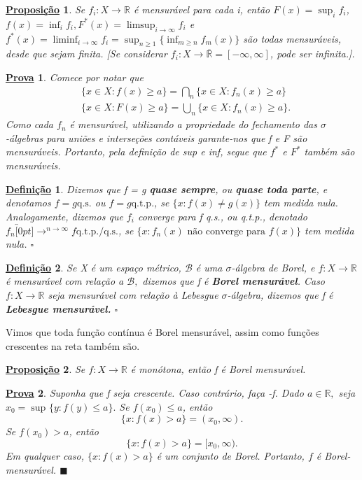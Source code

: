 \documentclass{article}
\newtheorem*{def*}{\underline{Defini\c c\~ao}}
\newtheorem*{prop*}{\underline{Proposi\c c\~ao}}
\newtheorem*{proof*}{\underline{Prova}}
\renewcommand\qedsymbol{$\blacksquare$}
\begin{document}
\begin{prop*}
  Se \(f_{i}:X\rightarrow \mathbb{R} \) é mensurável para cada i, então \(F(x) = \sup_{i}f_{i}\), \(f(x) = \inf_{i}f_{i}, F^{*}(x) = \limsup_{i\to \infty}f_{i}\)
  e \(f^{*}(x) = \liminf_{i\to \infty}f_{i} = \sup_{n\geq 1}\{\inf_{m\geq n}f_{m}(x)\}\) são todas mensuráveis, desde que sejam finita. [Se considerar \(f_{i}:X\rightarrow \overline{\mathbb{R}}=[-\infty, \infty]\), pode 
  ser infinita.].
\end{prop*}
\begin{proof*}
  Comece por notar que 
 \begin{align*}
   &\{x\in X: f(x) \geq a\} = \bigcap_{n}^{}\{x\in X: f_{n}(x) \geq a\}\\ 
   &\{x\in X: F(x) \geq a\} = \bigcup_{n}^{}\{x\in X: f_{n}(x) \geq a\}.
 \end{align*}
Como cada \(f_{n}\) é mensurável, utilizando a propriedade do fechamento das \(\sigma \)-álgebras para uniões e interseções contáveis garante-nos que f e F são mensuráveis. Portanto, pela definição de 
sup e inf, segue que \(f^{*}\) e \(F^{*}\) também são mensuráveis.
\end{proof*}
\begin{def*}
  Dizemos que f = g \textbf{quase sempre}, ou \textbf{quase toda parte}, e denotamos \(f= g \mathrm{q.s.}\) ou \(f = g \mathrm{q.t.p.}\), se \(\{x: f(x)\neq g(x)\}\) tem \textit{medida nula.} Analogamente, dizemos que 
 \(f_{i}\) converge para f q.s., ou q.t.p., denotado \(f_{n}\overbracket[0pt]{\longrightarrow}^{n\to \infty}f \mathrm{q.t.p.}/\mathrm{q.s.}\), se \(\{x: f_{n}(x) \text{ não converge para }f(x)\}\) tem \textit{medida nula}. \(\square\)
\end{def*}
\begin{def*}
  Se X é um espaço métrico, \(\mathcal{B}\) é uma \(\sigma \)-álgebra de Borel, e \(f:X\rightarrow \mathbb{R}\) é mensurável com relação a \(\mathcal{B},\) dizemos que f é \textbf{Borel mensurável}. Caso \(f:X\rightarrow \mathbb{R}\) seja 
  mensurável com relação à Lebesgue \(\sigma \)-álgebra, dizemos que f é \textbf{Lebesgue mensurável.} \(\square\)
\end{def*}
 Vimos que toda função contínua é Borel mensurável, assim como funções crescentes na reta também são.
\begin{prop*}
  Se \(f:X\rightarrow \mathbb{R}\) é monótona, então f é Borel mensurável.
\end{prop*}
\begin{proof*}
  Suponha que f seja crescente. Caso contrário, faça -f. Dado \(a\in \mathbb{R},\) seja \(x_{0}=\sup_{}\{y:f(y) \leq a\}.\) Se \(f(x_{0}) \leq a\), então 
    \[
      \{x: f(x) > a\} = (x_{0}, \infty).
    \]
  Se \(f(x_{0}) > a\), então 
    \[
      \{x:f(x) > a\}  = [x_{0}, \infty).
    \]
  Em qualquer caso, \(\{x: f(x) > a\}\) é um conjunto de Borel. Portanto, \(f\) é Borel-mensurável. \qedsymbol
\end{proof*}
\end{document}

